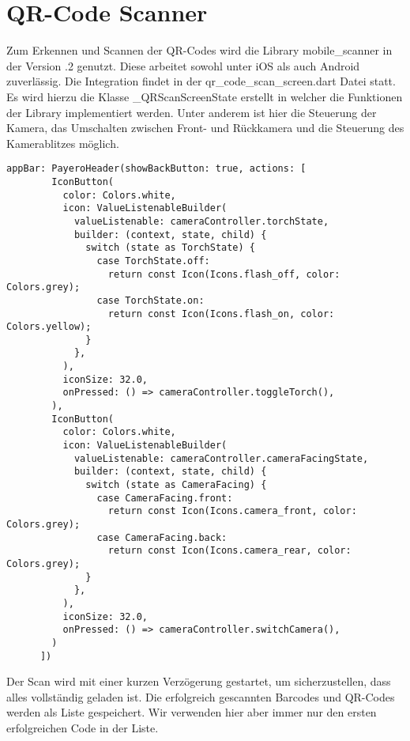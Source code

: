 \section{QR-Code Scanner}

Zum Erkennen und Scannen der QR-Codes wird die Library \glqq mobile\_scanner\grqq{} in der Version .2\grqq{} genutzt.
Diese arbeitet sowohl unter iOS als auch Android zuverlässig.
Die Integration findet in der \glqq qr\_code\_scan\_screen.dart\grqq{} Datei statt.
Es wird hierzu die Klasse \glqq \_QRScanScreenState\grqq{} erstellt in welcher die Funktionen der Library implementiert werden.
Unter anderem ist hier die Steuerung der Kamera, das Umschalten zwischen Front- und Rückkamera und die Steuerung des Kamerablitzes möglich.

\begin{lstlisting}[caption=Kamerasteuerung, label=cam_ctrl]
	appBar: PayeroHeader(showBackButton: true, actions: [
        IconButton(
          color: Colors.white,
          icon: ValueListenableBuilder(
            valueListenable: cameraController.torchState,
            builder: (context, state, child) {
              switch (state as TorchState) {
                case TorchState.off:
                  return const Icon(Icons.flash_off, color: Colors.grey);
                case TorchState.on:
                  return const Icon(Icons.flash_on, color: Colors.yellow);
              }
            },
          ),
          iconSize: 32.0,
          onPressed: () => cameraController.toggleTorch(),
        ),
        IconButton(
          color: Colors.white,
          icon: ValueListenableBuilder(
            valueListenable: cameraController.cameraFacingState,
            builder: (context, state, child) {
              switch (state as CameraFacing) {
                case CameraFacing.front:
                  return const Icon(Icons.camera_front, color: Colors.grey);
                case CameraFacing.back:
                  return const Icon(Icons.camera_rear, color: Colors.grey);
              }
            },
          ),
          iconSize: 32.0,
          onPressed: () => cameraController.switchCamera(),
        )
      ])
\end{lstlisting}

Der Scan wird mit einer kurzen Verzögerung gestartet, um sicherzustellen, dass alles vollständig geladen ist.
Die erfolgreich gescannten Barcodes und QR-Codes werden als Liste gespeichert.
Wir verwenden hier aber immer nur den ersten erfolgreichen Code in der Liste.


